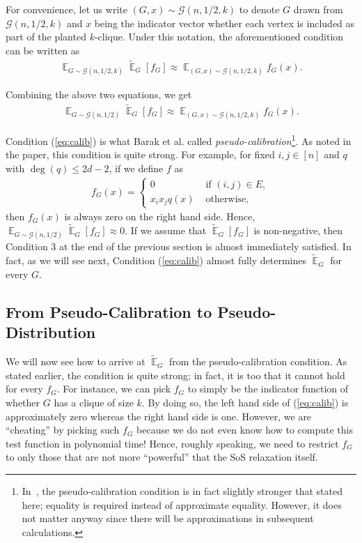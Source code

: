 \documentclass{article}[11pt]
\newcommand{\cG}{\mathcal{G}}
\newcommand{\E}{\mathop{\mathbb{E}}}
\newcommand{\tE}{\tilde{\E}}
\newcounter{section-preserve}
\begin{document}
For convenience, let us write $(G, x) \sim \cG(n, 1/2, k)$ to denote $G$ drawn from $\cG(n, 1/2, k)$ and $x$ being the indicator vector whether each vertex is included as part of the planted $k$-clique. Under this notation, the aforementioned condition can be written as
\begin{align*}
\E_{G \sim \cG(n, 1/2, k)} \tE_G[f_G] \approx \E_{(G, x) \sim \cG(n, 1/2, k)} f_G(x).
\end{align*}

Combining the above two equations, we get
\begin{align} \label{eq:calib}
\E_{G \sim \cG(n, 1/2)} \tE_G[f_G] \approx \E_{(G, x) \sim \cG(n, 1/2, k)} f_G(x).
\end{align}

Condition (\ref{eq:calib}) is what Barak et al. called \emph{pseudo-calibration}\footnote{In~\cite{BHKKMP16}, the pseudo-calibration condition is in fact slightly stronger that stated here; equality is required instead of approximate equality. However, it does not matter anyway since there will be approximations in subsequent calculations.}. As noted in the paper, this condition is quite strong. For example, for fixed $i, j \in [n]$ and $q$ with $\deg(q) \leq 2d - 2$, if we define $f$ as
\begin{align*}
f_G(x) =
\begin{cases}
0 & \text{ if } (i, j) \in E, \\
x_ix_jq(x) & \text{ otherwise},
\end{cases}
\end{align*}
then $f_G(x)$ is always zero on the right hand side. Hence, $\E_{G \sim \cG(n, 1/2)} \tE_G[f_G] \approx 0$. If we assume that $\tE_G[f_G]$ is non-negative, then Condition 3 at the end of the previous section is almost immediately satisfied. In fact, as we will see next, Condition (\ref{eq:calib}) almost fully determines $\tE_G$ for every $G$.

\subsection{From Pseudo-Calibration to Pseudo-Distribution}

We will now see how to arrive at $\tE_G$ from the pseudo-calibration condition. As stated earlier, the condition is quite strong; in fact, it is too that it cannot hold for every $f_G$. For instance, we can pick $f_G$ to simply be the indicator function of whether $G$ has a clique of size $k$. By doing so, the left hand side of (\ref{eq:calib}) is approximately zero whereas the right hand side is one. However, we are ``cheating'' by picking such $f_G$ because we do not even know how to compute this test function in polynomial time! Hence, roughly speaking, we need to restrict $f_G$ to only those that are not more ``powerful'' that the SoS relaxation itself.
\end{document}
